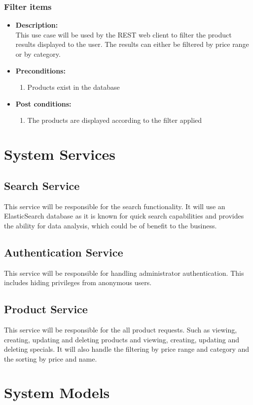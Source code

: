 \documentclass[a4paper,10pt]{article}
\begin{document}
\subsubsection{Filter items}
\begin{itemize}
	\item \textbf {Description:}\\
	This use case will be used by the REST web client to filter the product results displayed to the user. The results can either be filtered by price range or 		by category.
	\item \textbf {Preconditions:}
		\begin{enumerate}
			\item Products exist in the database
		\end{enumerate}
	\item \textbf {Post conditions:}
		\begin{enumerate}
			\item The products are displayed according to the filter applied
		\end{enumerate}
\end{itemize}
\section{System Services}
\subsection{Search Service}
This service will be responsible for the search functionality. It will use an ElasticSearch database as it is known for quick search capabilities and provides the ability for data analysis, which could be of benefit to the business.
\subsection{Authentication Service}
This service will be responsible for handling administrator authentication. This includes hiding privileges from anonymous users.
\subsection{Product Service}
This service will be responsible for the all product requests. Such as viewing, creating, updating and deleting products and viewing, creating, updating and deleting specials. It will also handle the filtering by price range and category and the sorting by price and name.
\section{System Models}
\end{document}
